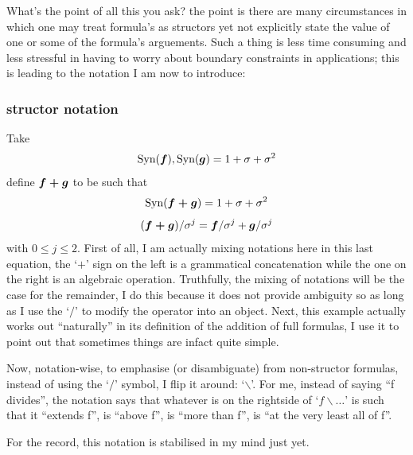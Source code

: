 \documentclass[twoside]{article}
\begin{document}
What's the point of all this you ask?  the point is there are many circumstances in which one may treat formula's as
structors yet not explicitly state the value of one or some of the formula's arguements.  Such a thing is less time
consuming and less stressful in having to worry about boundary constraints in applications; this is leading to the
notation I am now to introduce:

\subsubsection{structor notation}

Take
$$ \mbox{Syn}(\mbox{\boldmath $ f $}), \mbox{Syn}(\mbox{\boldmath $ g $})=1+\sigma+\sigma^2 $$
define $ \mbox{\boldmath $ f+g $} $
to be such that
$$ \mbox{Syn}(\mbox{\boldmath $ f+g $})=1+\sigma+\sigma^2 $$
$$ (\mbox{\boldmath $ f+g $})/\sigma^j=\mbox{\boldmath $ f $}/\sigma^j+\mbox{\boldmath $ g $}/\sigma^j $$
with $ 0\le j\le 2 $.  First of all, I am actually mixing notations here in this last equation, the `$ + $' sign on
the left is a grammatical concatenation while the one on the right is an algebraic operation.  Truthfully, the mixing
of notations will be the case for the remainder, I do this because it does not provide ambiguity so as long as I use
the `$ / $' to modify the operator into an object.  Next, this example actually works out ``naturally'' in its
definition of the addition of full formulas, I use it to point out that sometimes things are infact quite simple.

Now, notation-wise, to emphasise (or disambiguate) from non-structor formulas, instead of using the `$ / $' symbol,
I flip it around: `$ \backslash $'.  For me, instead of saying ``f divides'', the notation says that whatever is on
the rightside of `$ f\backslash\ldots $' is such that it ``extends f'', is ``above f'', is ``more than f'', is
``at the very least all of f''.

For the record, this notation is stabilised in my mind just yet.
\end{document}
